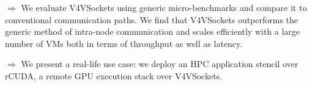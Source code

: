 \documentclass[a4shrink,portrait,final]{baposter}
\begin{document}
\begin{poster}
{$\Rightarrow$ We evaluate V4VSockets using generic micro-benchmarks and compare
it to conventional communication paths. We find that V4VSockets outperforms the
generic method of intra-node communication and scales efficiently with a large
number of VMs both in terms of throughput as well as latency.

$\Rightarrow$ We present a real-life use case: we deploy an HPC application
stencil over rCUDA, a remote GPU execution stack over V4VSockets.

\vspace{1em}
}

%
%
%

\end{poster}
\end{document}
